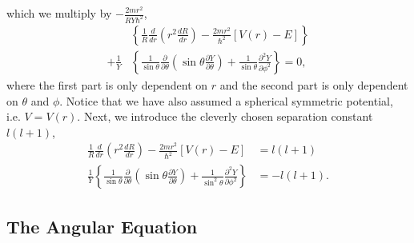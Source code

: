 which we multiply by $-\frac{2mr^2}{RY\hbar^2}$,
\begin{equation}
    \begin{aligned}
        &
        \left\{ 
            \frac{1}{R}\frac{d}{dr}
                \left(r^2\frac{dR}{dr} \right)
            -
            \frac{2mr^2}{\hbar^2}
                \left[V(r) - E \right]
        \right\}
        \\ + \frac{1}{Y} &
        \left\{
            \frac{1}{\sin\theta }\frac{\partial}{\partial\theta}
                \left(\sin\theta \frac{\partial Y}{\partial\theta} \right)
            +
            \frac{1}{\sin\theta}\frac{\partial^2Y}{\partial\phi^2}
        \right\}
        = 0,
    \end{aligned}
\end{equation}
where the first part is only dependent on $r$ and the second part is only
dependent on $\theta$ and $\phi$. Notice that we have also assumed a spherical 
symmetric potential, i.e. $V=V(r)$. Next, we introduce the cleverly chosen 
separation constant $l(l + 1)$,
\begin{align}
    \label{eq:the_radial_equation}
    \frac{1}{R}\frac{d}{dr}
        \left(r^2\frac{dR}{dr}\right)
    -
    \frac{2mr^2}{\hbar^2}\left[V(r) - E \right] 
    &= l (l + 1) \\
    \label{eq:the_angular_equation}
    \frac{1}{Y}\left\{ 
        \frac{1}{\sin\theta}\frac{\partial}{\partial\theta}
            \left(\sin\theta \frac{\partial Y}{\partial\theta} \right)
        +
        \frac{1}{\sin^2\theta}\frac{\partial^2 Y}{\partial \phi^2}
    \right\} 
    &= - l (l + 1).
\end{align}

\subsection{The Angular Equation}

